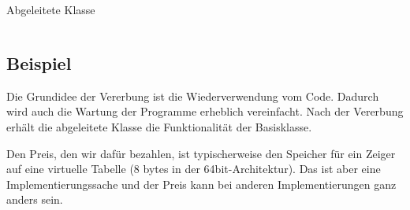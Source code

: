 \begin{code}
	\caption{Abgeleitete Klasse}
	\label{code:vtbl:call}
	\inputminted{cpp}{code/virt_table/call.c}
\end{code}

\subsection{Beispiel}
Die Grundidee der Vererbung ist die Wiederverwendung vom Code.
Dadurch wird auch die Wartung der Programme erheblich vereinfacht.
Nach der Vererbung erhält die abgeleitete Klasse die Funktionalität der Basisklasse.

Den Preis, den wir dafür bezahlen, ist typischerweise den Speicher für ein Zeiger auf eine virtuelle Tabelle (8 bytes in der 64bit-Architektur).
Das ist aber eine Implementierungssache und der Preis kann bei anderen Implementierungen ganz anders sein.


\begin{code}
	\inputminted{cpp}{code/employees_virt/employee.h}
\end{code}

\begin{code}
	\inputminted{cpp}{code/employees_virt/employee.c}
\end{code}



